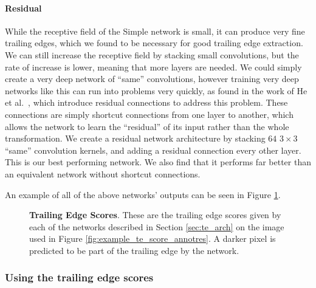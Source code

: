 \paragraph{Residual}
While the receptive field of the Simple network is small, it can produce very fine trailing edges, which we found to be necessary for good trailing edge extraction.
We can still increase the receptive field by stacking small convolutions, but the rate of increase is lower, meaning that more layers are needed.
We could simply create a very deep network of ``same'' convolutions, however training very deep networks like this can run into problems very quickly, as found in the work of He et al.\ \cite{he2015deep}, which introduce residual connections to address this problem.
These connections are simply shortcut connections from one layer to another, which allows the network to learn the ``residual'' of its input rather than the whole transformation.
We create a residual network architecture by stacking $64$ $3\times3$ ``same'' convolution kernels, and adding a residual connection every other layer.
This is our best performing network.
We also find that it performs far better than an equivalent network without shortcut connections.

An example of all of the above networks' outputs can be seen in Figure \ref{fig:example_te_scores_all}.

\begin{figure}[t]%
\centering
{}
\newline
{}
\caption{\textbf{Trailing Edge Scores}. These are the trailing edge scores given by each of the networks described in Section \ref{sec:te_arch} on the image used in Figure \ref{fig:example_te_score_annotres}. A darker pixel is predicted to be part of the trailing edge by the network.}
\label{fig:example_te_scores_all}
\end{figure}

\subsubsection{Using the trailing edge scores}

